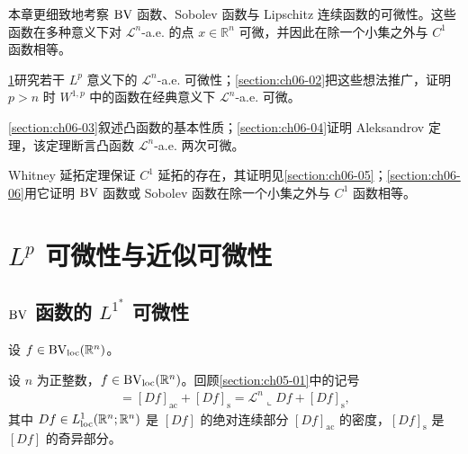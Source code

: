 \documentclass[../../main.tex]{subfiles}%
\begin{document}
本章更细致地考察 $\mathrm{BV}$ 函数、Sobolev 函数与 Lipschitz 连续函数的可微性。这些函数在多种意义下对 $\mathcal{L}^n$-a.e. 的点 $x\in\mathbb{R}^n$ 可微，并因此在除一个小集之外与 $C^1$ 函数相等。

\cref{section:ch06-01}研究若干 $L^p$ 意义下的 $\mathcal{L}^n$-a.e. 可微性；\cref{section:ch06-02}把这些想法推广，证明 $p>n$ 时 $W^{1,p}$ 中的函数在经典意义下 $\mathcal{L}^n$-a.e. 可微。%

\cref{section:ch06-03}叙述凸函数的基本性质；\cref{section:ch06-04}证明 Aleksandrov 定理，该定理断言凸函数 $\mathcal{L}^n$-a.e. 两次可微。%

Whitney 延拓定理保证 $C^1$ 延拓的存在，其证明见\cref{section:ch06-05}；\cref{section:ch06-06}用它证明 $\mathrm{BV}$ 函数或 Sobolev 函数在除一个小集之外与 $C^1$ 函数相等。%

\section{$L^p$ 可微性与近似可微性}\label{section:ch06-01}

\subsection{$\mathrm{BV}$ 函数的 $L^{1^{*}}$ 可微性}\label{subsection:ch06-01-1}

设 $f\in\mathrm{BV}_{\mathrm{loc}}(\mathbb{R}^n)$。

\begin{remark}\label{remark:ch06-01-记号}
设 $n$ 为正整数，$f\in\mathrm{BV}_{\mathrm{loc}}(\mathbb{R}^n)$。回顾\cref{section:ch05-01}中的记号%
\begin{align*}
[Df]=[Df]_{\mathrm{ac}}+[Df]_{\mathrm{s}}=\mathcal{L}^n\llcorner Df+[Df]_{\mathrm{s}},
\end{align*}
其中 $Df\in L^1_{\mathrm{loc}}(\mathbb{R}^n;\mathbb{R}^n)$ 是 $[Df]$ 的绝对连续部分 $[Df]_{\mathrm{ac}}$ 的密度，$[Df]_{\mathrm{s}}$ 是 $[Df]$ 的奇异部分。
\end{remark}
\end{document}
